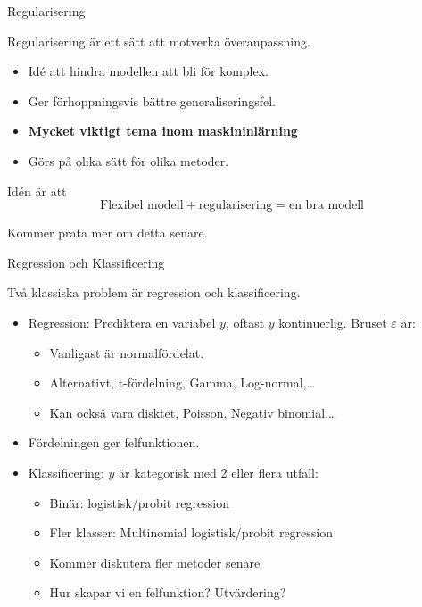 \documentclass[10pt,english]{beamer}
\begin{document}
\begin{frame}{Regularisering}

    Regularisering är ett sätt att motverka överanpassning.

    \begin{itemize}
        \item Idé att hindra modellen att bli för komplex.
        \item Ger förhoppningsvis bättre generaliseringsfel.
        \item \textbf{Mycket viktigt tema inom maskininlärning}
        \item Görs på olika sätt för olika metoder.
    \end{itemize}

    Idén är att
    \begin{equation*}
        \text{Flexibel modell} + \text{regularisering} = \text{en bra modell}
    \end{equation*}

    Kommer prata mer om detta senare.

\end{frame}

\begin{frame}{Regression och Klassificering}
    
    Två klassiska problem är regression och klassificering.

    \begin{itemize}
        \item Regression: Prediktera en variabel $y$, oftast $y$ kontinuerlig. Bruset $\varepsilon$ är:
        \begin{itemize}
            \item Vanligast är normalfördelat.
            \item Alternativt, t-fördelning, Gamma, Log-normal,\dots
            \item Kan också vara disktet, Poisson, Negativ binomial,\dots
        \end{itemize}
        \item Fördelningen ger felfunktionen.
        \item Klassificering: $y$ är kategorisk med 2 eller flera utfall:
        \begin{itemize}
            \item Binär: logistisk/probit regression
            \item Fler klasser: Multinomial logistisk/probit regression
            \item Kommer diskutera fler metoder senare
            \item Hur skapar vi en felfunktion? Utvärdering?
        \end{itemize}
    \end{itemize}

\end{frame}
\end{document}
